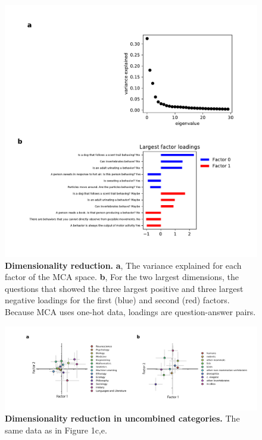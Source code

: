 \documentclass[a4paper, 11pt]{article}
\begin{document}
\begin{figure}
\centerline{\includegraphics[width=\textwidth]{supp_fig2.pdf}}
\caption{\textbf{Dimensionality reduction.} \textbf{a}, The variance explained for each factor of the MCA space. \textbf{b}, For the two largest dimensions, the questions that showed the three largest positive and three largest negative loadings for the first (blue) and second (red) factors. Because MCA uses one-hot data, loadings are question-answer pairs.}
\end{figure}
\newpage

\begin{figure}
\centerline{\includegraphics[width=\textwidth]{supp_fig3.pdf}}
\caption{\textbf{Dimensionality reduction in uncombined categories.} The same data as in Figure 1c,e.}
\end{figure}
\newpage
\end{document}
